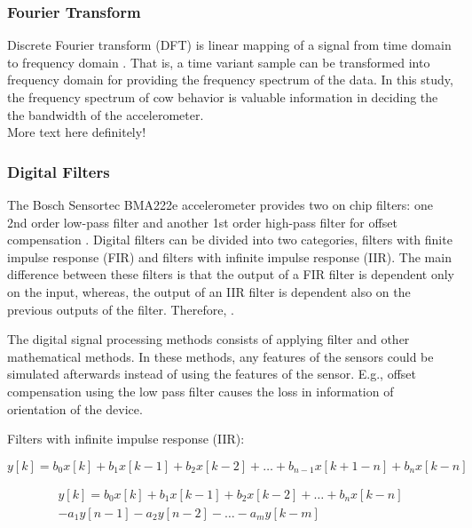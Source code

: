 \documentclass[english,12pt,a4paper,pdftex,elec,utf8]{aaltothesis}
\begin{document}
\subsubsection{Fourier Transform} \label{fouriertransformsection}

Discrete Fourier transform (DFT) is linear mapping of a signal from time domain to frequency domain \cite{rao2012fast}. That is, a time variant sample can be transformed into frequency domain for providing the frequency spectrum of the data. In this study, the frequency spectrum of cow behavior is valuable information in deciding the the bandwidth of the accelerometer.\\

More text here definitely!


\subsubsection{Digital Filters} \label{digitalfilterssection}


The Bosch Sensortec BMA222e accelerometer provides two on chip filters: one 2nd order low-pass filter and another 1st order high-pass filter for offset compensation \cite{bma222datasheet}. Digital filters can be divided into two categories, filters with finite impulse response (FIR) and filters with infinite impulse response (IIR). The main difference between these filters is that the output of a FIR filter is dependent only on the input, whereas, the output of an IIR filter is dependent also on the previous outputs of the filter. Therefore, \cite{digitalfilters} \cite{khan2005digital}.

The digital signal processing methods consists of applying filter and other mathematical methods. In these methods, any features of the sensors could be simulated afterwards instead of using the features of the sensor. E.g., offset compensation using the low pass filter causes the loss in information of orientation of the device.

Filters with infinite impulse response (IIR):




\begin{equation}
y[k] = b_0 x[k] + b_1 x[k-1] + b_2 x[k-2] + \dots + b_{n-1} x[k+1-n] + b_n x[k-n]
\end{equation}



\begin{equation}
\begin{aligned}
y[k] = b_0 x[k] + b_1 x[k-1] + b_2 x[k-2] + \dots + b_n x[k-n] \\
-a_1 y[n-1] - a_2 y[n-2] - \dots - a_m y[k-m]
\end{aligned}
\end{equation}
\end{document}
